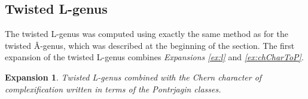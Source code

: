 \documentclass{amsart}
\theoremstyle{plain}
\newcommand{\ch}{\mathrm{ch}}
\numberwithin{equation}{section}
\newtheorem{ex}{Expansion}
\begin{document}
%
%
%
%
%
%



%
%
%
%
%
%




\medskip
\subsection{\bf Twisted L-genus}

The twisted L-genus was computed using exactly the same method as for the twisted \^{A}-genus, which was described at the beginning of the section. 
The first expansion of the twisted L-genus combines \textit{Expansions \ref{ex:l}} and \textit{\ref{ex:chCharToP}}.

\begin{ex}
Twisted L-genus combined with the Chern character of complexification written in terms of the Pontrjagin classes.
\end{ex} 

\end{document}
